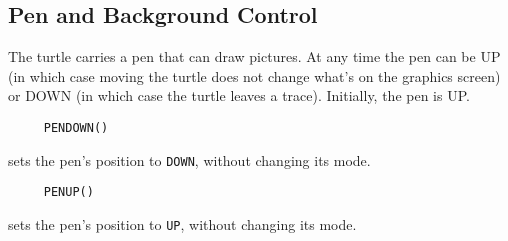 




\subsection{Pen and Background Control}
\label{logoturtle:PBC}

The turtle carries a pen that can draw pictures.  At any time the pen
can be UP (in which case moving the turtle does not change what's on the
graphics screen) or DOWN (in which case the turtle leaves a trace).
Initially, the pen is UP.

\begin{verbatim}
     PENDOWN()
\end{verbatim}
sets the pen's position to \texttt{DOWN}, without changing its mode.

\begin{verbatim}
     PENUP()
\end{verbatim}
sets the pen's position to \texttt{UP}, without changing its mode.

